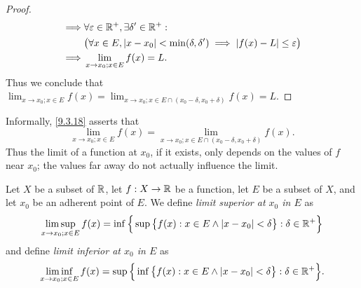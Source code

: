 \begin{proof}
\begin{align*}
    \implies & \forall \varepsilon \in \mathbb{R}^+, \exists \delta' \in \mathbb{R}^+ :                                                                              \\
             & \big(\forall x \in E, \left\lvert x - x_0\right\rvert < \min(\delta, \delta') \implies \left\lvert f(x) - L\right\rvert \leq \varepsilon\big)                             \\
    \implies & \lim_{x \to x_0 ; x \in E} f(x) = L.
  \end{align*}
  Thus we conclude that \(\lim_{x \to x_0 ; x \in E} f(x) = \lim_{x \to x_0 ; x \in E \cap (x_0 - \delta, x_0 + \delta)} f(x) = L\).
\end{proof}

\begin{note}
  Informally, \cref{9.3.18} asserts that
  \[
    \lim_{x \to x_0 ; x \in E} f(x) = \lim_{x \to x_0 ; x \in E \cap (x_0 - \delta, x_0 + \delta)} f(x).
  \]
  Thus the limit of a function at \(x_0\), if it exists, only depends on the values of \(f\) near \(x_0\);
  the values far away do not actually influence the limit.
\end{note}

\begin{ac}\label{ac:9.3.1}
  Let \(X\) be a subset of \(\mathbb{R}\), let \(f : X \to \mathbb{R}\) be a function, let \(E\) be a subset of \(X\), and let \(x_0\) be an adherent point of \(E\).
  We define \emph{limit superior at \(x_0\) in \(E\)} as
  \[
    \limsup_{x \to x_0 ; x \in E} f(x) = \inf\Big\{\sup\big\{f(x) : x \in E \land \left\lvert x - x_0\right\rvert < \delta\big\} : \delta \in \mathbb{R}^+\Big\}
  \]
  and define \emph{limit inferior at \(x_0\) in \(E\)} as
  \[
    \liminf_{x \to x_0 ; x \in E} f(x) = \sup\Big\{\inf\big\{f(x) : x \in E \land \left\lvert x - x_0\right\rvert < \delta\big\} : \delta \in \mathbb{R}^+\Big\}.
  \]
\end{ac}

